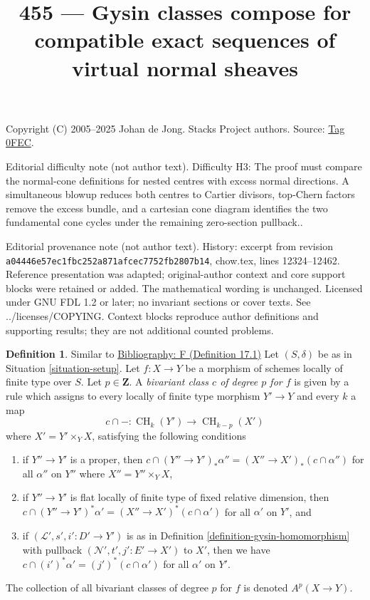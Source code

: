 \documentclass{amsart}
\newenvironment{reference}{\comment}{\endcomment}
\theoremstyle{plain}
\theoremstyle{definition}
\newtheorem{definition}[subsection]{Definition}
\theoremstyle{remark}
\numberwithin{equation}{subsection}
\def\CH{\mathop{\mathrm{CH}}\nolimits}
\begin{document}
\title[Stacks Project, Tag 0FEC]{455 --- Gysin classes compose for compatible exact sequences of virtual normal sheaves}
\maketitle
\noindent Copyright (C) 2005--2025 Johan de Jong. Stacks Project authors. Source: \href{https://stacks.math.columbia.edu/tag/0FEC}{Tag 0FEC}.

\noindent Editorial difficulty note (not author text). Difficulty H3: The proof must compare the normal-cone definitions for nested centres with excess normal directions. A simultaneous blowup reduces both centres to Cartier divisors, top-Chern factors remove the excess bundle, and a cartesian cone diagram identifies the two fundamental cone cycles under the remaining zero-section pullback..

\noindent Editorial provenance note (not author text). History: excerpt from revision \texttt{a0444\allowbreak 6e57e\allowbreak c1fbc\allowbreak 252a8\allowbreak 71afc\allowbreak ec775\allowbreak 2fb28\allowbreak 07b14}, chow.tex, lines 12324--12462. Reference presentation was adapted; original-author context and core support blocks were retained or added. The mathematical wording is unchanged. Licensed under GNU FDL 1.2 or later; no invariant sections or cover texts. See ../licenses/COPYING. Context blocks reproduce author definitions and supporting results; they are not additional counted problems.

\begin{definition}
\label{definition-bivariant-class}
\begin{reference}
Similar to \href{https://stacks.math.columbia.edu/bibliography}{Bibliography: F (Definition 17.1)}
\end{reference}
Let $(S, \delta)$ be as in Situation \ref{situation-setup}.
Let $f : X \to Y$ be a morphism of schemes locally of finite type over $S$.
Let $p \in \mathbf{Z}$.
A {\it bivariant class $c$ of degree $p$ for $f$} is given by a rule
which assigns to every locally of finite type morphism $Y' \to Y$
and every $k$ a map
$$
c \cap - : \CH_k(Y') \longrightarrow \CH_{k - p}(X')
$$
where $X' = Y' \times_Y X$, satisfying the following conditions
\begin{enumerate}
\item if $Y'' \to Y'$ is a proper, then
$c \cap (Y'' \to Y')_*\alpha'' = (X'' \to X')_*(c \cap \alpha'')$
for all $\alpha''$ on $Y''$ where $X'' = Y'' \times_Y X$,
\item if $Y'' \to Y'$ is flat locally of finite type of
fixed relative dimension, then
$c \cap (Y'' \to Y')^*\alpha' = (X'' \to X')^*(c \cap \alpha')$
for all $\alpha'$ on $Y'$, and
\item if $(\mathcal{L}', s', i' : D' \to Y')$ is as in
Definition \ref{definition-gysin-homomorphism}
with pullback $(\mathcal{N}', t', j' : E' \to X')$ to $X'$,
then we have $c \cap (i')^*\alpha' = (j')^*(c \cap \alpha')$
for all $\alpha'$ on $Y'$.
\end{enumerate}
The collection of all bivariant classes of degree $p$ for $f$ is
denoted $A^p(X \to Y)$.
\end{definition}
\end{document}
